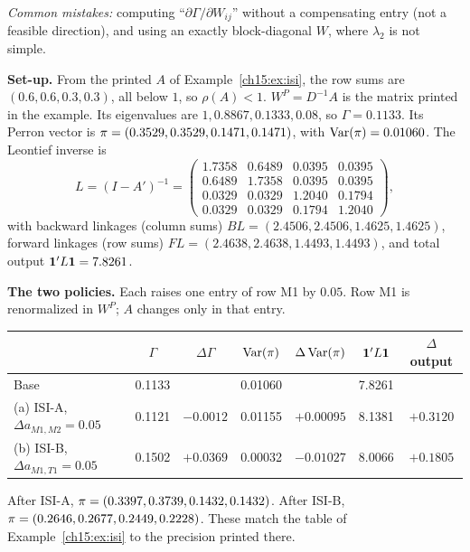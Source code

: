\documentclass[../solutions_manual.tex]{subfiles}
\begin{document}
\emph{Common mistakes:} computing ``$\partial\Gamma/\partial W_{ij}$'' without a compensating entry (not a feasible direction), and using an exactly block-diagonal $W$, where $\lambda_2$ is not simple.


 \textbf{Set-up.} From the printed $A$ of Example~\ref{ch15:ex:isi}, the row sums are $(0.6, 0.6, 0.3, 0.3)$, all below $1$, so $\rho(A) < 1$. $W^P = D^{-1}A$ is the matrix printed in the example. Its eigenvalues are $1, 0.8867, 0.1333, 0.08$, so $\Gamma = 0.1133$. Its Perron vector is $\pi = (0.3529,\allowbreak 0.3529,\allowbreak 0.1471,\allowbreak 0.1471)$, with $\operatorname{Var}(\pi) = 0.01060$. The Leontief inverse is
\[
L = (I - A')^{-1} = \begin{pmatrix}
1.7358 & 0.6489 & 0.0395 & 0.0395\\
0.6489 & 1.7358 & 0.0395 & 0.0395\\
0.0329 & 0.0329 & 1.2040 & 0.1794\\
0.0329 & 0.0329 & 0.1794 & 1.2040\end{pmatrix},
\]
with backward linkages (column sums) $BL = (2.4506,\allowbreak 2.4506,\allowbreak 1.4625,\allowbreak 1.4625)$, forward linkages (row sums) $FL = (2.4638,\allowbreak 2.4638,\allowbreak 1.4493,\allowbreak 1.4493)$, and total output $\mathbf{1}'L\mathbf{1} = 7.8261$.

\textbf{The two policies.} Each raises one entry of row M1 by $0.05$. Row M1 is renormalized in $W^P$; $A$ changes only in that entry.

\begin{center}
\small\setlength{\tabcolsep}{4pt}
\begin{tabular}{lcccccc}
\toprule
& $\Gamma$ & $\Delta\Gamma$ & $\operatorname{Var}(\pi)$ & $\Delta\operatorname{Var}(\pi)$ & $\mathbf{1}'L\mathbf{1}$ & $\Delta$ output \\
\midrule
Base & 0.1133 & & 0.01060 & & 7.8261 & \\
(a) ISI-A, $\Delta a_{M1,M2} = 0.05$ & 0.1121 & $-0.0012$ & 0.01155 & $+0.00095$ & 8.1381 & $+0.3120$ \\
(b) ISI-B, $\Delta a_{M1,T1} = 0.05$ & 0.1502 & $+0.0369$ & 0.00032 & $-0.01027$ & 8.0066 & $+0.1805$ \\
\bottomrule
\end{tabular}
\end{center}
After ISI-A, $\pi = (0.3397,\allowbreak 0.3739,\allowbreak 0.1432,\allowbreak 0.1432)$. After ISI-B, $\pi = (0.2646,\allowbreak 0.2677,\allowbreak 0.2449,\allowbreak 0.2228)$. These match the table of Example~\ref{ch15:ex:isi} to the precision printed there.
\end{document}
